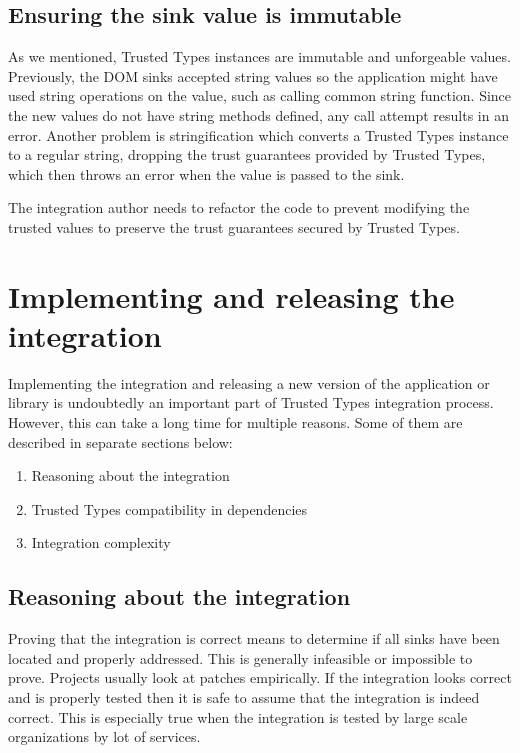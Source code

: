 \label{tt_integration_ensure_tt_not_altered}
\subsection{Ensuring the sink value is immutable}

As we mentioned, Trusted Types instances are immutable and unforgeable values. Previously, the DOM
sinks accepted string values so the application might have used string operations on the value, such
as calling common string function. Since the new values do not have string methods defined, any call
attempt results in an error. Another problem is stringification which converts a Trusted Types
instance to a regular string, dropping the trust guarantees provided by Trusted Types, which then
throws an error when the value is passed to the sink.

The integration author needs to refactor the code to prevent modifying the trusted values to
preserve the trust guarantees secured by Trusted Types.

\section{Implementing and releasing the integration}

Implementing the integration and releasing a new version of the application or library is
undoubtedly an important part of Trusted Types integration process. However, this can take a long
time for multiple reasons. Some of them are described in separate sections below:

\begin{enumerate}
  \item Reasoning about the integration
  \item Trusted Types compatibility in dependencies
  \item Integration complexity
\end{enumerate}

\subsection{Reasoning about the integration}
\label{sub:reason_about_integration}

Proving that the integration is correct means to determine if all sinks have been located and
properly addressed. This is generally infeasible or impossible to prove. Projects usually look at
patches empirically. If the integration looks correct and is properly tested then it is safe to
assume that the integration is indeed correct. This is especially true when the integration is
tested by large scale organizations by lot of services.

